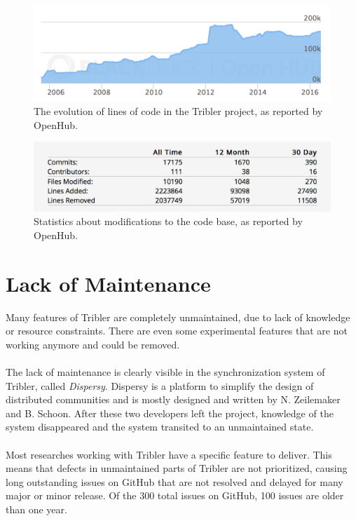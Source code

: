 \begin{figure}[!h]
	\centering
	\includegraphics[width=\columnwidth]{images/openhub_loc}
	\caption{The evolution of lines of code in the Tribler project, as reported by OpenHub.}
	\label{fig:openhub-loc}
\end{figure}

\begin{figure}[!h]
	\centering
	\includegraphics[width=0.6\columnwidth]{images/openhub_commits_table}
	\caption{Statistics about modifications to the code base, as reported by OpenHub.}
	\label{fig:openhub-commit-stats}
\end{figure}

\section{Lack of Maintenance}
Many features of Tribler are completely unmaintained, due to lack of knowledge or resource constraints. There are even some experimental features that are not working anymore and could be removed.\\\\
The lack of maintenance is clearly visible in the synchronization system of Tribler, called \emph{Dispersy}. Dispersy is a platform to simplify the design of distributed communities and is mostly designed and written by
N. Zeilemaker and B. Schoon\cite{zeilemaker2013dispersy}. After these two developers left the project, knowledge of the system disappeared and the system transited to an unmaintained state.\\\\
Most researches working with Tribler have a specific feature to deliver. This means that defects in unmaintained parts of Tribler are not prioritized, causing long outstanding issues on GitHub that are not resolved and delayed for many major or minor release. Of the 300 total issues on GitHub, 100 issues are older than one year.
 

